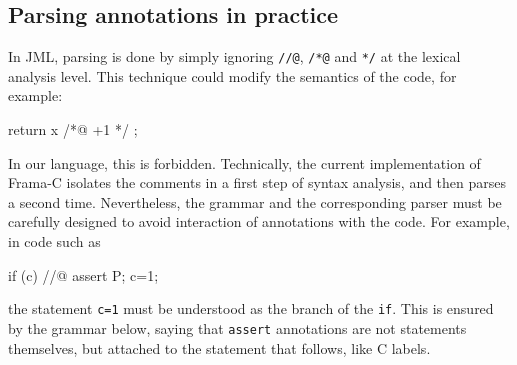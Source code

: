 \subsection{Parsing annotations in practice}

In JML, parsing is done by simply ignoring \verb|//@|, \verb|/*@| and
\verb|*/| at the lexical analysis level. This technique could modify the
semantics of the code, for example:
\begin{listing}{1}
return x /*@ +1 */ ;
\end{listing}
In our language, this is forbidden. Technically, the current
implementation of Frama-C isolates the comments in a first step of
syntax analysis, and then parses a second time. Nevertheless, the
grammar and the corresponding parser must be carefully designed to
avoid interaction of annotations with the code. For example, in code such as
\begin{listing}{1}
  if (c) //@ assert P;
     c=1;
\end{listing}
the statement \lstinline|c=1| must be understood as the
branch of the \texttt{if}. This is ensured by the grammar below,
saying that \lstinline|assert| annotations are not statements themselves,
but attached to the statement that follows, like C labels.
